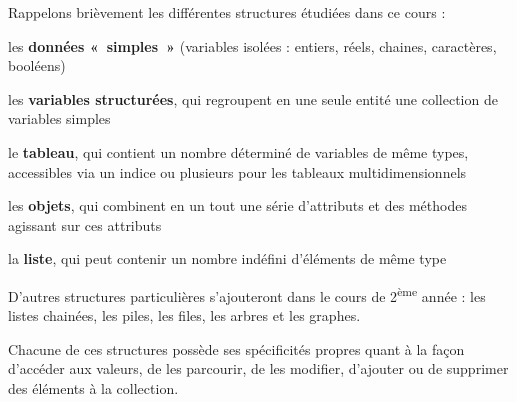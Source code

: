Rappelons brièvement les différentes structures étudiées dans ce cours
 :

\begin{liste}
	\item 
		les \textbf{données «~simples~»} (variables isolées : entiers, réels,
		chaines, caractères, booléens)
	\item 
		les \textbf{variables structurées}, qui regroupent en une seule entité
		une collection de variables simples
	\item 
		le \textbf{tableau}, qui contient un nombre déterminé de variables de
		même types, accessibles via un indice ou plusieurs pour les tableaux
		multidimensionnels
	\item 
		les \textbf{objets}, qui combinent en un tout une série d’attributs et
		des méthodes agissant sur ces attributs
	\item 
		la \textbf{liste}, qui peut contenir un nombre indéfini d’éléments de
		même type
\end{liste}

D’autres structures particulières s’ajouteront dans le cours de
2\textsuperscript{ème} année : les listes chainées, les piles, les
files, les arbres et les graphes.

Chacune de ces structures possède ses spécificités propres quant à la
façon d’accéder aux valeurs, de les parcourir, de les modifier,
d’ajouter ou de supprimer des éléments à la collection. 




